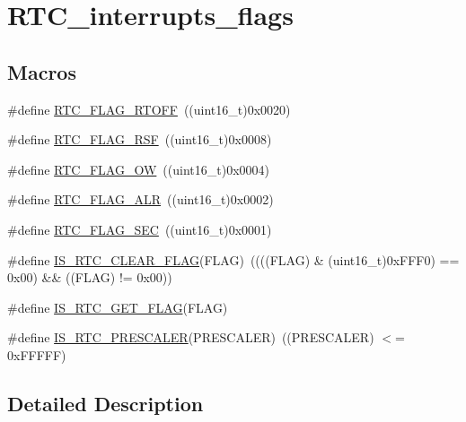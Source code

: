 \hypertarget{group___r_t_c__interrupts__flags}{}\section{R\+T\+C\+\_\+interrupts\+\_\+flags}
\label{group___r_t_c__interrupts__flags}
\subsection*{Macros}
\begin{DoxyCompactItemize}
\item 
\#define \mbox{\hyperlink{group___r_t_c__interrupts__flags_ga203dcbb991497e4d0e6722815f6db942}{R\+T\+C\+\_\+\+F\+L\+A\+G\+\_\+\+R\+T\+O\+FF}}~((uint16\+\_\+t)0x0020)
\item 
\#define \mbox{\hyperlink{group___r_t_c__interrupts__flags_ga78c4245996bef8d5f39226b6e37ed9c0}{R\+T\+C\+\_\+\+F\+L\+A\+G\+\_\+\+R\+SF}}~((uint16\+\_\+t)0x0008)
\item 
\#define \mbox{\hyperlink{group___r_t_c__interrupts__flags_ga4e321e359b914d7ed10eed985f8b4811}{R\+T\+C\+\_\+\+F\+L\+A\+G\+\_\+\+OW}}~((uint16\+\_\+t)0x0004)
\item 
\#define \mbox{\hyperlink{group___r_t_c__interrupts__flags_gaed4375a7ea5a147f83c6cf4bfa805caf}{R\+T\+C\+\_\+\+F\+L\+A\+G\+\_\+\+A\+LR}}~((uint16\+\_\+t)0x0002)
\item 
\#define \mbox{\hyperlink{group___r_t_c__interrupts__flags_ga8babb2c823c2097bf4a4ef0c20ef7367}{R\+T\+C\+\_\+\+F\+L\+A\+G\+\_\+\+S\+EC}}~((uint16\+\_\+t)0x0001)
\item 
\#define \mbox{\hyperlink{group___r_t_c__interrupts__flags_ga5f8a9327a258f16f29703fa3e3cc8af7}{I\+S\+\_\+\+R\+T\+C\+\_\+\+C\+L\+E\+A\+R\+\_\+\+F\+L\+AG}}(F\+L\+AG)~((((F\+L\+AG) \& (uint16\+\_\+t)0x\+F\+F\+F0) == 0x00) \&\& ((\+F\+L\+A\+G) != 0x00))
\item 
\#define \mbox{\hyperlink{group___r_t_c__interrupts__flags_ga2126725a0d48f1c40f42566e249620ef}{I\+S\+\_\+\+R\+T\+C\+\_\+\+G\+E\+T\+\_\+\+F\+L\+AG}}(F\+L\+AG)
\item 
\#define \mbox{\hyperlink{group___r_t_c__interrupts__flags_ga483b9ec67246cbfb2874c5a85f0cb4d8}{I\+S\+\_\+\+R\+T\+C\+\_\+\+P\+R\+E\+S\+C\+A\+L\+ER}}(P\+R\+E\+S\+C\+A\+L\+ER)~((P\+R\+E\+S\+C\+A\+L\+ER) $<$= 0x\+F\+F\+F\+F\+F)
\end{DoxyCompactItemize}


\subsection{Detailed Description}



